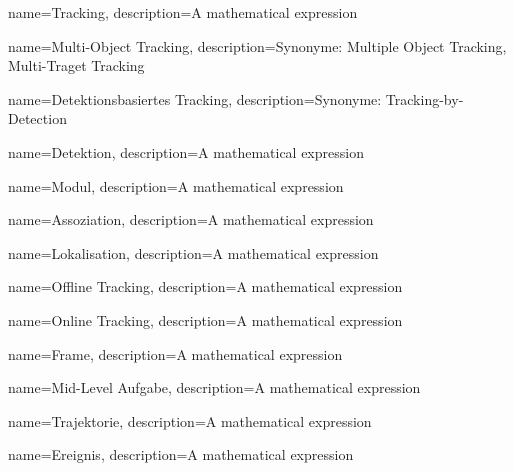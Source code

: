 {
        name=Tracking,
        description={A mathematical expression}
}

{
        name=Multi-Object Tracking,
        description={Synonyme: Multiple Object Tracking, Multi-Traget Tracking}
}

{
        name=Detektionsbasiertes Tracking,
        description={Synonyme: Tracking-by-Detection}
}

{
        name=Detektion,
        description={A mathematical expression}
}

{
        name=Modul,
        description={A mathematical expression}
}

{
        name=Assoziation,
        description={A mathematical expression}
}

{
        name=Lokalisation,
        description={A mathematical expression}
}

{
        name=Offline Tracking,
        description={A mathematical expression}
}

{
        name=Online Tracking,
        description={A mathematical expression}
}

{
        name=Frame,
        description={A mathematical expression}
}

{
        name=Mid-Level Aufgabe,
        description={A mathematical expression}
}

{
        name=Trajektorie,
        description={A mathematical expression}
}

{
        name=Ereignis,
        description={A mathematical expression}
}



